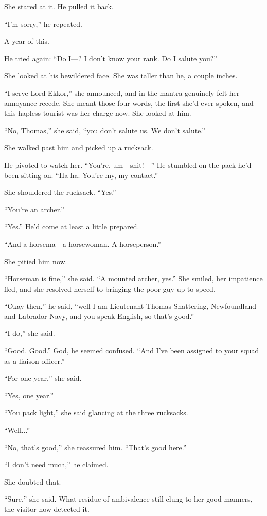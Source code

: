 \documentclass[11pt,a5paper]{article}
\begin{document}
She stared at it. He pulled it back.

``I'm sorry,'' he repeated.

A year of this.

He tried again: ``Do I---? I don't know your rank. Do I salute you?''

She looked at his bewildered face. She was taller than he, a couple inches.

``I serve Lord Ekkor,'' she announced, and in the mantra genuinely felt her annoyance recede. She meant those four words, the first she'd ever spoken, and this hapless tourist was her charge now. She looked at him.

``No, Thomas,'' she said, ``you don't salute us. We don't salute.''

She walked past him and picked up a rucksack.

He pivoted to watch her. ``You're, um---shit!---'' He stumbled on the pack he'd been sitting on. ``Ha ha. You're my, my contact.''

She shouldered the rucksack. ``Yes.''

``You're an archer.''

``Yes.'' He'd come at least a little prepared.

``And a horsema---a horsewoman. A horseperson.''

She pitied him now.

``Horseman is fine,'' she said. ``A mounted archer, yes.'' She smiled, her impatience fled, and she resolved herself to bringing the poor guy up to speed.

``Okay then,'' he said, ``well I am Lieutenant Thomas Shattering, Newfoundland and Labrador Navy, and you speak English, so that's good.''

``I do,'' she said.

``Good. Good.'' God, he seemed confused. ``And I've been assigned to your squad as a liaison officer.''

``For one year,'' she said.

``Yes, one year.''

``You pack light,'' she said glancing at the three rucksacks.

``Well...''

``No, that's good,'' she reassured him. ``That's good here.''

``I don't need much,'' he claimed.

She doubted that.

``Sure,'' she said. What residue of ambivalence still clung to her good manners, the visitor now detected it.
\end{document}
